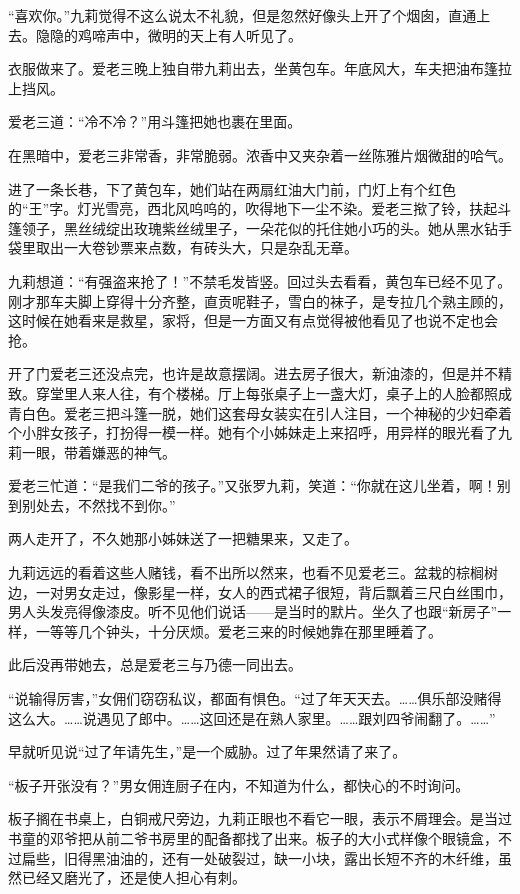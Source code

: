 \par “喜欢你。”九莉觉得不这么说太不礼貌，但是忽然好像头上开了个烟囱，直通上去。隐隐的鸡啼声中，微明的天上有人听见了。
\par 衣服做来了。爱老三晚上独自带九莉出去，坐黄包车。年底风大，车夫把油布篷拉上挡风。
\par 爱老三道：“冷不冷？”用斗篷把她也裹在里面。
\par 在黑暗中，爱老三非常香，非常脆弱。浓香中又夹杂着一丝陈雅片烟微甜的哈气。
\par 进了一条长巷，下了黄包车，她们站在两扇红油大门前，门灯上有个红色的“王”字。灯光雪亮，西北风呜呜的，吹得地下一尘不染。爱老三揿了铃，扶起斗篷领子，黑丝绒绽出玫瑰紫丝绒里子，一朵花似的托住她小巧的头。她从黑水钻手袋里取出一大卷钞票来点数，有砖头大，只是杂乱无章。
\par 九莉想道：“有强盗来抢了！”不禁毛发皆竖。回过头去看看，黄包车已经不见了。刚才那车夫脚上穿得十分齐整，直贡呢鞋子，雪白的袜子，是专拉几个熟主顾的，这时候在她看来是救星，家将，但是一方面又有点觉得被他看见了也说不定也会抢。
\par 开了门爱老三还没点完，也许是故意摆阔。进去房子很大，新油漆的，但是并不精致。穿堂里人来人往，有个楼梯。厅上每张桌子上一盏大灯，桌子上的人脸都照成青白色。爱老三把斗篷一脱，她们这套母女装实在引人注目，一个神秘的少妇牵着个小胖女孩子，打扮得一模一样。她有个小姊妹走上来招呼，用异样的眼光看了九莉一眼，带着嫌恶的神气。
\par 爱老三忙道：“是我们二爷的孩子。”又张罗九莉，笑道：“你就在这儿坐着，啊！别到别处去，不然找不到你。”
\par 两人走开了，不久她那小姊妹送了一把糖果来，又走了。
\par 九莉远远的看着这些人赌钱，看不出所以然来，也看不见爱老三。盆栽的棕榈树边，一对男女走过，像影星一样，女人的西式裙子很短，背后飘着三尺白丝围巾，男人头发亮得像漆皮。听不见他们说话——是当时的默片。坐久了也跟“新房子”一样，一等等几个钟头，十分厌烦。爱老三来的时候她靠在那里睡着了。
\par 此后没再带她去，总是爱老三与乃德一同出去。
\par “说输得厉害，”女佣们窃窃私议，都面有惧色。“过了年天天去。……俱乐部没赌得这么大。……说遇见了郎中。……这回还是在熟人家里。……跟刘四爷闹翻了。……”
\par 早就听见说“过了年请先生，”是一个威胁。过了年果然请了来了。
\par “板子开张没有？”男女佣连厨子在内，不知道为什么，都快心的不时询问。
\par 板子搁在书桌上，白铜戒尺旁边，九莉正眼也不看它一眼，表示不屑理会。是当过书童的邓爷把从前二爷书房里的配备都找了出来。板子的大小式样像个眼镜盒，不过扁些，旧得黑油油的，还有一处破裂过，缺一小块，露出长短不齐的木纤维，虽然已经又磨光了，还是使人担心有刺。

